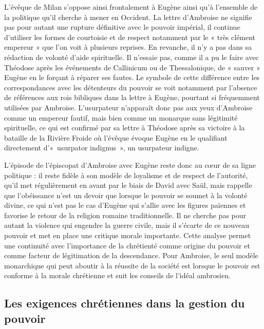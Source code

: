 L'évêque de Milan s’oppose ainsi frontalement à Eugène ainsi qu’à l’ensemble de la politique qu’il cherche à mener en Occident. La lettre d’Ambroise ne signifie pas pour autant une rupture définitive avec le pouvoir impérial, il continue d’utiliser les formes de courtoisie et de respect notamment par le « très clément empereur » que l’on voit à plusieurs reprises. En revanche, il n’y a pas dans sa rédaction de volonté d’aide spirituelle. Il n’essaie pas, comme il a pu le faire avec Théodose après les événements de Callinicum ou de Thessalonique, de « sauver » Eugène en le forçant à réparer ses fautes. Le symbole de cette différence entre les correspondances avec les détenteurs du pouvoir se voit notamment par l’absence de références aux rois bibliques dans la lettre à Eugène, pourtant si fréquemment utilisées par Ambroise. L’usurpateur n’apparaît donc pas aux yeux d’Ambroise comme un empereur fautif, mais bien comme un monarque sans légitimité spirituelle, ce qui est confirmé par sa lettre à Théodose après sa victoire à la bataille de la Rivière Froide où l’évêque évoque Eugène en le qualifiant directement d’«~usurpator indignus~», un usurpateur indigne\autocite[\nopp ec. 2, 1]{ambroise_csel_82_3}.

\bigskip

L’épisode de l’épiscopat d’Ambroise avec Eugène reste donc au cœur de sa ligne politique : il reste fidèle à son modèle de loyalisme et de respect de l’autorité, qu’il met régulièrement en avant par le biais de David avec Saül, mais rappelle que l’obéissance n’est un devoir que lorsque le pouvoir se soumet à la volonté divine, ce qui n’est pas le cas d’Eugène qui s’allie avec les figures païennes et favorise le retour de la religion romaine traditionnelle. Il ne cherche pas pour autant la violence qui engendre la guerre civile, mais il s'écarte de ce nouveau pouvoir et met en place une critique morale importante. Cette analyse permet une continuité avec l'importance de la chrétienté comme origine du pouvoir et comme facteur de légitimation de la descendance. Pour Ambroise, le seul modèle monarchique qui peut aboutir à la réussite de la société est lorsque le pouvoir est conforme à la morale chrétienne et suit les conseils de l'idéal ambrosien.

\bigskip

\subsection{Les exigences chrétiennes dans la gestion du pouvoir}


